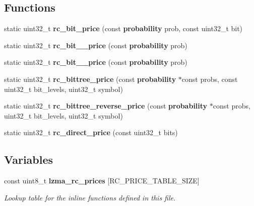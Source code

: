 \subsection*{Functions}
\begin{DoxyCompactItemize}
\item 
static uint32\-\_\-t {\bfseries rc\-\_\-bit\-\_\-price} (const {\bf probability} prob, const uint32\-\_\-t bit)\label{price_8h_a31730e694ca6966ca15e74a297ca2ef1}

\item 
static uint32\-\_\-t {\bfseries rc\-\_\-bit\-\_\-\_\-price} (const {\bf probability} prob)\label{price_8h_aa7d8f51846076b5a310edfd2de431c03}

\item 
static uint32\-\_\-t {\bfseries rc\-\_\-bit\-\_\-\_\-price} (const {\bf probability} prob)\label{price_8h_ab1d9ec6e6e4fd2d1ee018e2fff39e665}

\item 
static uint32\-\_\-t {\bfseries rc\-\_\-bittree\-\_\-price} (const {\bf probability} $\ast$const probs, const uint32\-\_\-t bit\-\_\-levels, uint32\-\_\-t symbol)\label{price_8h_a5157fa388a830caeb7451cf7d7e11d07}

\item 
static uint32\-\_\-t {\bfseries rc\-\_\-bittree\-\_\-reverse\-\_\-price} (const {\bf probability} $\ast$const probs, uint32\-\_\-t bit\-\_\-levels, uint32\-\_\-t symbol)\label{price_8h_a7b8971dfba6f48c072b507a3e5a580fa}

\item 
static uint32\-\_\-t {\bfseries rc\-\_\-direct\-\_\-price} (const uint32\-\_\-t bits)\label{price_8h_ae1dc528c9c6a82bbd07adfa94b5710ee}

\end{DoxyCompactItemize}
\subsection*{Variables}
\begin{DoxyCompactItemize}
\item 
const uint8\-\_\-t {\bf lzma\-\_\-rc\-\_\-prices} [R\-C\-\_\-\-P\-R\-I\-C\-E\-\_\-\-T\-A\-B\-L\-E\-\_\-\-S\-I\-Z\-E]
\begin{DoxyCompactList}\small\item\em Lookup table for the inline functions defined in this file. \end{DoxyCompactList}\end{DoxyCompactItemize}


